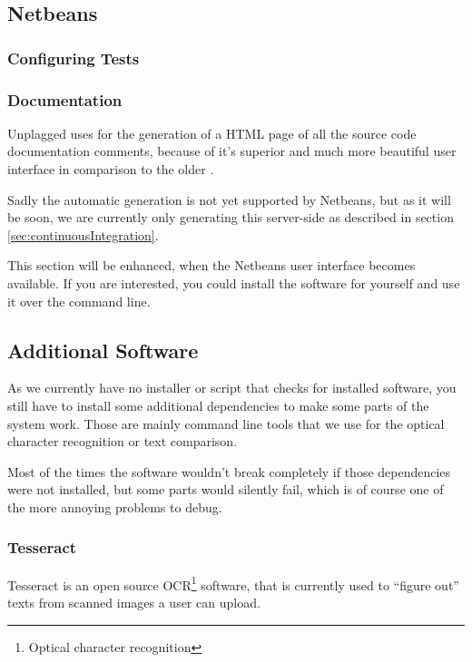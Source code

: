\subsection{Netbeans}

\subsubsection{Configuring Tests}

\subsubsection{Documentation}

Unplagged uses \href{http://apigen.org/}{\citet{Apigen}} for the generation of a HTML page of all the source code documentation comments, 
because of it's superior and much more beautiful user interface in comparison to the older 
\href{http://www.phpdoc.org/}{\citet{PHPDocumentor}}.

Sadly the automatic generation is not yet supported by Netbeans, but as it will be soon\citep{Heise2012}, we are
currently only generating this server-side as described in section \ref{sec:continuousIntegration}. 

This section will be enhanced, when the Netbeans user interface becomes available. If you are interested, you could 
install the software for yourself and use it over the command line.

\subsection{Additional Software}

As we currently have no installer or script that checks for installed software, you still have to install some
additional dependencies to make some parts of the system work. Those are mainly command line tools that we use
for the optical character recognition or text comparison.

Most of the times the software wouldn't break completely if those dependencies were not installed, but some parts 
would silently fail, which is of course one of the more annoying problems to debug.

\subsubsection{Tesseract}

Tesseract is an open source OCR\footnote{Optical character recognition} software, that is currently used to \enquote{figure out}
texts from scanned images a user can upload. 

